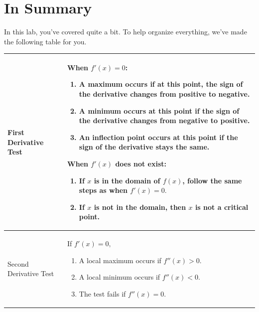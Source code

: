 \documentclass{ximera}
\begin{document}
\section{In Summary}
In this lab, you've covered quite a bit. To help organize everything, we've made the following table for you.


\begin{tabular}{| l | p{7.5cm} |}
\hline
First Derivative Test & When $f'(x) = 0$: \begin{enumerate}
\item{A maximum occurs if at this point, the sign of the derivative changes from positive to negative.}
\item{A minimum occurs at this point if the sign of the derivative changes from negative to positive.}
\item{An inflection point occurs at this point if the sign of the derivative stays the same.}
\end{enumerate}
When $f'(x)$ does not exist:
\begin{enumerate}
\item{If $x$ is in the domain of $f(x)$, follow the same steps as when $f'(x)=0\text{.}$}
\item{If $x$ is not in the domain, then $x$ is not a critical point.}
\end{enumerate}\\
\hline
Second Derivative Test &  \hspace{5mm}If $f'(x)=0\text{,}$ \begin{enumerate}
\item{A local maximum occurs if $f''(x)>0$.}
\item{A local minimum occurs if $f''(x)<0$.}
\item{The test fails if $f''(x)=0$.}
\end{enumerate}\\ \hline
\end{tabular}
\end{document}
